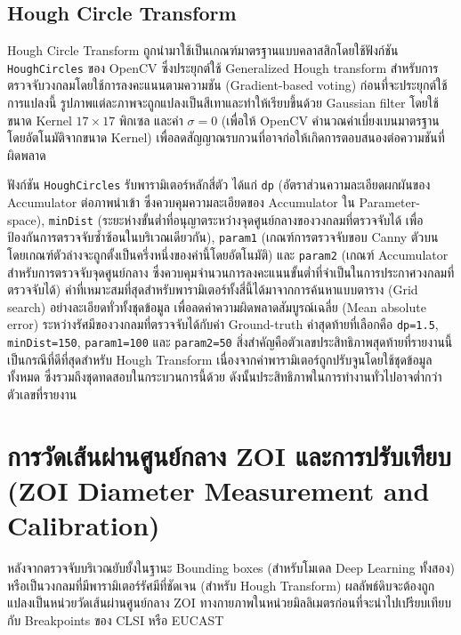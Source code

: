 \subsection{Hough Circle Transform}

Hough Circle Transform ถูกนำมาใช้เป็นเกณฑ์มาตรฐานแบบคลาสสิกโดยใช้ฟังก์ชัน \texttt{HoughCircles} ของ OpenCV ซึ่งประยุกต์ใช้ Generalized Hough transform สำหรับการตรวจจับวงกลมโดยใช้การลงคะแนนตามความชัน (Gradient-based voting) ก่อนที่จะประยุกต์ใช้การแปลงนี้ รูปภาพแต่ละภาพจะถูกแปลงเป็นสีเทาและทำให้เรียบขึ้นด้วย Gaussian filter โดยใช้ขนาด Kernel $17 \times 17$ พิกเซล และค่า $\sigma = 0$ (เพื่อให้ OpenCV คำนวณค่าเบี่ยงเบนมาตรฐานโดยอัตโนมัติจากขนาด Kernel) เพื่อลดสัญญาณรบกวนที่อาจก่อให้เกิดการตอบสนองต่อความชันที่ผิดพลาด

ฟังก์ชัน \texttt{HoughCircles} รับพารามิเตอร์หลักสี่ตัว ได้แก่ \texttt{dp} (อัตราส่วนความละเอียดผกผันของ Accumulator ต่อภาพนำเข้า ซึ่งควบคุมความละเอียดของ Accumulator ใน Parameter-space), \texttt{minDist} (ระยะห่างขั้นต่ำที่อนุญาตระหว่างจุดศูนย์กลางของวงกลมที่ตรวจจับได้ เพื่อป้องกันการตรวจจับซ้ำซ้อนในบริเวณเดียวกัน), \texttt{param1} (เกณฑ์การตรวจจับขอบ Canny ตัวบน โดยเกณฑ์ตัวล่างจะถูกตั้งเป็นครึ่งหนึ่งของค่านี้โดยอัตโนมัติ) และ \texttt{param2} (เกณฑ์ Accumulator สำหรับการตรวจจับจุดศูนย์กลาง ซึ่งควบคุมจำนวนการลงคะแนนขั้นต่ำที่จำเป็นในการประกาศวงกลมที่ตรวจจับได้) ค่าที่เหมาะสมที่สุดสำหรับพารามิเตอร์ทั้งสี่นี้ได้มาจากการค้นหาแบบตาราง (Grid search) อย่างละเอียดทั่วทั้งชุดข้อมูล เพื่อลดค่าความผิดพลาดสัมบูรณ์เฉลี่ย (Mean absolute error) ระหว่างรัศมีของวงกลมที่ตรวจจับได้กับค่า Ground-truth ค่าสุดท้ายที่เลือกคือ \texttt{dp=1.5}, \texttt{minDist=150}, \texttt{param1=100} และ \texttt{param2=50} สิ่งสำคัญคือตัวเลขประสิทธิภาพสุดท้ายที่รายงานนี้เป็นกรณีที่ดีที่สุดสำหรับ Hough Transform เนื่องจากค่าพารามิเตอร์ถูกปรับจูนโดยใช้ชุดข้อมูลทั้งหมด ซึ่งรวมถึงชุดทดสอบในกระบวนการนี้ด้วย ดังนั้นประสิทธิภาพในการทำงานทั่วไปอาจต่ำกว่าตัวเลขที่รายงาน

\section{การวัดเส้นผ่านศูนย์กลาง ZOI และการปรับเทียบ (ZOI Diameter Measurement and Calibration)}

หลังจากตรวจจับบริเวณยับยั้งในฐานะ Bounding boxes (สำหรับโมเดล Deep Learning ทั้งสอง) หรือเป็นวงกลมที่มีพารามิเตอร์รัศมีที่ชัดเจน (สำหรับ Hough Transform) ผลลัพธ์ดิบจะต้องถูกแปลงเป็นหน่วยวัดเส้นผ่านศูนย์กลาง ZOI ทางกายภาพในหน่วยมิลลิเมตรก่อนที่จะนำไปเปรียบเทียบกับ Breakpoints ของ CLSI หรือ EUCAST

